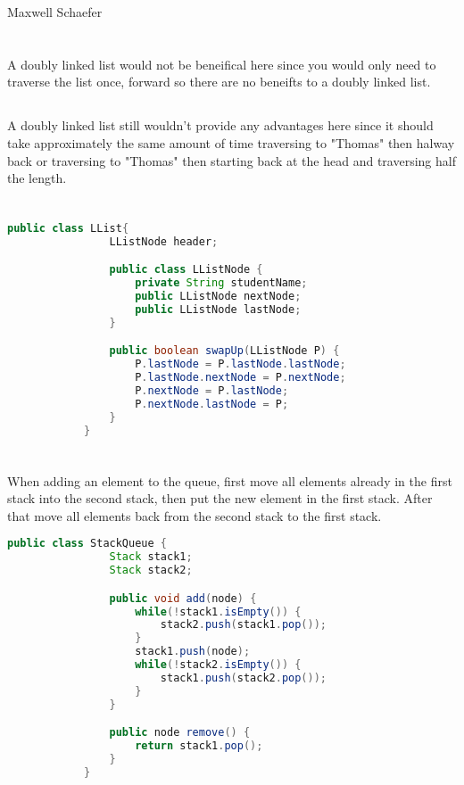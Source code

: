 \documentclass{article}
\begin{document}
    Maxwell Schaefer

    \section{}
        \subsection{}
        A doubly linked list would not be beneifical here since you would only need to traverse the list once, forward so there are no beneifts to a doubly linked list.
        \subsection{}
        A doubly linked list still wouldn't provide any advantages here since it should take approximately the same amount of time traversing to "Thomas" then halway back or traversing to "Thomas" then starting back at the head and traversing half the length.
    \section{}
        \begin{lstlisting}[language=java]
            public class LList{
                LListNode header;

                public class LListNode {
                    private String studentName;
                    public LListNode nextNode;
                    public LListNode lastNode;
                }

                public boolean swapUp(LListNode P) {
                    P.lastNode = P.lastNode.lastNode;
                    P.lastNode.nextNode = P.nextNode;
                    P.nextNode = P.lastNode;
                    P.nextNode.lastNode = P;
                }
            }
        \end{lstlisting}
    \section{}
        \subsection{}
        When adding an element to the queue, first move all elements already in the first stack into the second stack, then put the new element in the first stack. After that move all elements back from the second stack to the first stack.
        \begin{lstlisting}[language=java]
            public class StackQueue {
                Stack stack1;
                Stack stack2;

                public void add(node) {
                    while(!stack1.isEmpty()) {
                        stack2.push(stack1.pop());
                    }
                    stack1.push(node);
                    while(!stack2.isEmpty()) {
                        stack1.push(stack2.pop());
                    }
                }

                public node remove() {
                    return stack1.pop();
                }
            }
        \end{lstlisting}
\end{document}
